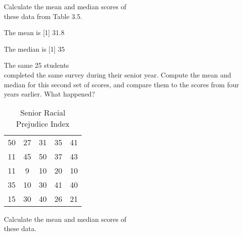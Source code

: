\documentclass[11pt]{book}\usepackage[]{graphicx}\usepackage[]{color}
\begin{document}
\begin{exercises}
\begin{exercise}
\begin{table}[htbp]
{{   \label{tab:t3_12}
   }}
\end{table}

  Calculate the mean and median scores of \\ these data from Table 3.5.

	\vspace{2mm}
	\end{exercise}
	\begin{solution}   %

	The mean is
[1] 31.8


	The median is
[1] 35


	\end{solution}

	  \begin{exercise} %

The same 25 students \\ completed the same survey during their senior  year.  Compute the mean and median for this second set of scores, and compare them to the scores from four years earlier.   What happened?

\begin{table}[htbp]
   \centering
   {\small{
   \caption{Senior Racial Prejudice Index}
   \begin{tabular}{@{} ccccc  @{}} \hline %
   50 & 27 & 31 & 35 & 41 \\
   11 & 45 & 50 & 37 & 43 \\
   11 & 9  & 10 & 20 & 10 \\
   35 & 10 & 30 & 41 & 40 \\
   15 & 30 & 40 & 26 & 21 \\ \hline
   \end{tabular}
   }}

   \label{tab:t3_6a}
\end{table}

  Calculate the mean and median scores of \\ these data.

	\vspace{2mm}
	\end{exercise}
	\vspace{2mm}
	\begin{solution}   %




\end{solution}
\end{exercises}
\end{document}
